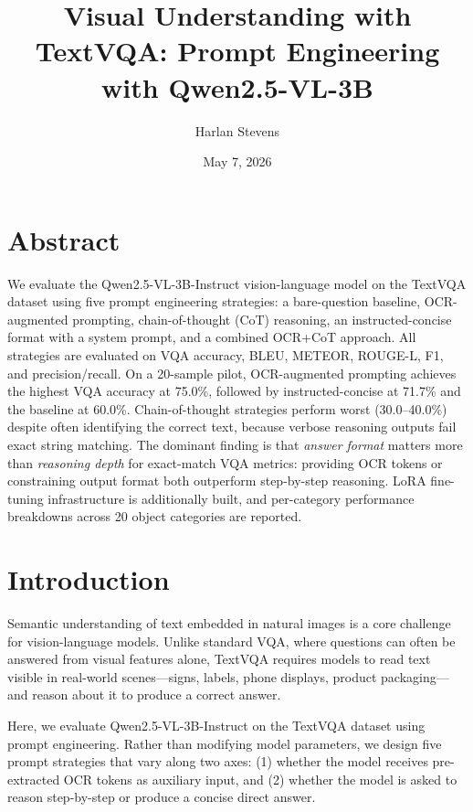 \documentclass[11pt]{article}
\title{Visual Understanding with TextVQA: Prompt Engineering with Qwen2.5-VL-3B}
\author{
  Harlan Stevens \\
}
\date{May 7, 2026}
\begin{document}
\maketitle


\section{Abstract}

We evaluate the Qwen2.5-VL-3B-Instruct vision-language model on the TextVQA dataset using five prompt engineering strategies: a bare-question baseline, OCR-augmented prompting, chain-of-thought (CoT) reasoning, an instructed-concise format with a system prompt, and a combined OCR+CoT approach. All strategies are evaluated on VQA accuracy, BLEU, METEOR, ROUGE-L, F1, and precision/recall. On a 20-sample pilot, OCR-augmented prompting achieves the highest VQA accuracy at 75.0\%, followed by instructed-concise at 71.7\% and the baseline at 60.0\%. Chain-of-thought strategies perform worst (30.0--40.0\%) despite often identifying the correct text, because verbose reasoning outputs fail exact string matching. The dominant finding is that \textit{answer format} matters more than \textit{reasoning depth} for exact-match VQA metrics: providing OCR tokens or constraining output format both outperform step-by-step reasoning. LoRA fine-tuning infrastructure is additionally built, and per-category performance breakdowns across 20 object categories are reported.


\section{Introduction}

Semantic understanding of text embedded in natural images is a core challenge for vision-language models. Unlike standard VQA, where questions can often be answered from visual features alone, TextVQA \citep{singh2019textvqa} requires models to read text visible in real-world scenes---signs, labels, phone displays, product packaging---and reason about it to produce a correct answer.

Here, we evaluate Qwen2.5-VL-3B-Instruct \citep{bai2023qwenvl} on the TextVQA dataset using prompt engineering. Rather than modifying model parameters, we design five prompt strategies that vary along two axes: (1) whether the model receives pre-extracted OCR tokens as auxiliary input, and (2) whether the model is asked to reason step-by-step or produce a concise direct answer.
\end{document}
